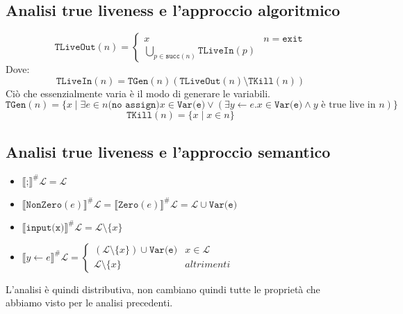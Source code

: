 \subsection{Analisi true liveness e l'approccio algoritmico}
\begin{equation}
    \texttt{TLiveOut}(n) =
        \begin{cases}
            x & n = \texttt{exit}\\
            \bigcup_{p \in \texttt{succ}(n)} \texttt{TLiveIn}(p)
        \end{cases}
\end{equation}
Dove:
\begin{equation}
    \texttt{TLiveIn}(n) = \texttt{TGen}(n) ( \texttt{TLiveOut}(n) \setminus \texttt{TKill}(n))
\end{equation}
Ciò che essenzialmente varia è il modo di generare le variabili.
\begin{equation}
    \texttt{TGen}(n) = \{x \mid \exists e \in n \texttt{(no assign)} x \in \texttt{Var(e)} \lor 
    (\exists y \gets e . x \in \texttt{Var(e)} \land y\text{ è true live in }n)\}
\end{equation}
\begin{equation}
    \texttt{TKill}(n) = \{x \mid x \in n\}
\end{equation}
\subsection{Analisi true liveness e l'approccio semantico}
\begin{itemize}
    \item $\llbracket\texttt{;} \rrbracket^\# \mathcal{L} = \mathcal{L}$
    \item $\llbracket \texttt{NonZero}(e) \rrbracket^\# \mathcal{L} = 
    \llbracket \texttt{Zero}(e) \rrbracket^\# \mathcal{L}
    = \mathcal{L} \cup \texttt{Var(e)}$
    \item $\llbracket \texttt{input(x)} \rrbracket^\# \mathcal{L} =
    \mathcal{L} \setminus \{x\}$
    \item $\llbracket y \gets e \rrbracket^\# \mathcal{L} = 
    \begin{cases}
        (\mathcal{L} \setminus \{x\}) \cup \texttt{Var(e)} & x \in \mathcal{L}\\
        \mathcal{L} \setminus \{x\} & \textit{altrimenti}
    \end{cases}
    $
\end{itemize}
L'analisi è quindi distributiva, non cambiano quindi tutte le proprietà 
che abbiamo visto per le analisi precedenti.
